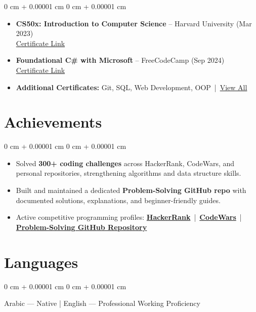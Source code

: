 \documentclass[10pt, letterpaper]{article}
\newenvironment{highlights}{
    \begin{itemize}[
        topsep=0.10 cm,
        parsep=0.10 cm,
        partopsep=0pt,
        itemsep=0pt,
        leftmargin=0 cm + 10pt
    ]
}{
    \end{itemize}
} %
\newenvironment{onecolentry}{
    \begin{adjustwidth}{
        0 cm + 0.00001 cm
    }{
        0 cm + 0.00001 cm
    }
}{
    \end{adjustwidth}
} %
\begin{document}
    \begin{onecolentry}
        \begin{highlights}
            \item \textbf{CS50x: Introduction to Computer Science} – Harvard University (Mar 2023) \\
            \href{https://certificates.cs50.io/c0e68d5d-f4a0-43d5-924d-221dc9ac5d0c.pdf?size=letter}{Certificate Link}
    
            \item \textbf{Foundational C\# with Microsoft} – FreeCodeCamp (Sep 2024) \\
            \href{https://www.freecodecamp.org/certification/mahmoud_mattar/foundational-c-sharp-with-microsoft}{Certificate Link}
    
            \item \textbf{Additional Certificates:} Git, SQL, Web Development, OOP \,|\, 
            \href{https://github.com/M7-TROJAN/my-certifications}{View All}
        \end{highlights}
    \end{onecolentry}

    \section{Achievements}
    
    \begin{onecolentry}
        \begin{highlights}
            \item Solved \textbf{300+ coding challenges} across HackerRank, CodeWars, and personal repositories, strengthening algorithms and data structure skills.
            \item Built and maintained a dedicated \textbf{Problem-Solving GitHub repo} with documented solutions, explanations, and beginner-friendly guides.
            \item Active competitive programming profiles: 
            \textbf{\href{https://www.hackerrank.com/profile/matterm74m7}{HackerRank}} \,|\, 
            \textbf{\href{https://www.codewars.com/users/M7-TROJAN}{CodeWars}} \,|\, 
            \textbf{\href{https://github.com/M7-TROJAN/Problem-Solving}{Problem-Solving GitHub Repository}}
        \end{highlights}
    \end{onecolentry}

\vspace{0.3cm}

\noindent
\begin{minipage}{\textwidth}
\section{Languages}
\begin{onecolentry}
    Arabic — Native \; | \; English — Professional Working Proficiency
\end{onecolentry}
\end{minipage}
\end{document}
